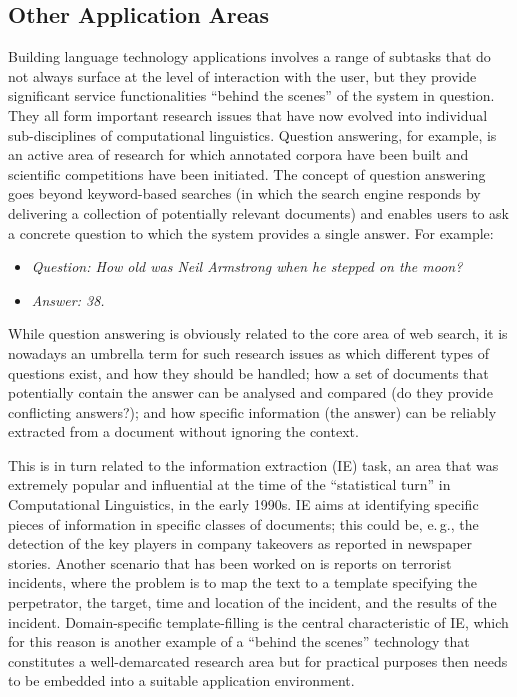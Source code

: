 \documentclass[]{../../metanetpaper}
\begin{document}
\begin{multicols}{2}
\subsection{Other Application Areas}

Building language technology applications involves a range of subtasks that do not always surface at the level of interaction with the user, but they provide significant service functionalities “behind the scenes” of the system in question. They all form important research issues that have now evolved into individual sub-disciplines of computational linguistics.  Question answering, for example, is an active area of research for which annotated corpora have been built and scientific competitions have been initiated. The concept of question answering goes beyond keyword-based searches (in which the search engine responds by delivering a collection of potentially relevant documents) and enables users to ask a concrete question to which the system provides a single answer. For example:

\begin{itemize}
\item[] \textit{Question: How old was Neil Armstrong when he stepped on the moon?}
\item[] \textit{Answer: 38.}
\end{itemize}

While question answering is obviously related to the core area of web search, it is nowadays an umbrella term for such research issues as which different types of questions exist, and how they should be handled; how a set of documents that potentially contain the answer can be analysed and compared (do they provide conflicting answers?); and how specific information (the answer) can be reliably extracted from a document without ignoring the context. 


This is in turn related to the information extraction (IE) task, an area that was extremely popular and influential at the time of the ``statistical turn'' in Computational Linguistics, in the early 1990s. IE aims at identifying specific pieces of information in specific classes of documents; this could be, e.\,g., the detection of the key players in company takeovers as reported in newspaper stories. Another scenario that has been worked on is reports on terrorist incidents, where the problem is to map the text to a template specifying the perpetrator, the target, time and location of the incident, and the results of the incident. Domain-specific template-filling is the central characteristic of IE, which for this reason is another example of a ``behind the scenes'' technology that constitutes a well-demarcated research area but for practical purposes then needs to be embedded into a suitable application environment. 


\end{multicols}
\end{document}

